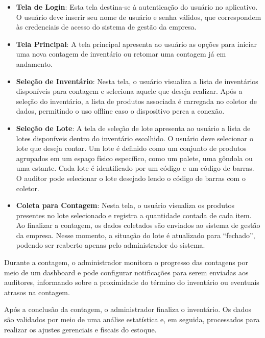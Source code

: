 \begin{itemize}
    \item \textbf{Tela de Login}: Esta tela destina-se à autenticação do usuário no aplicativo. O usuário deve inserir seu nome de usuário e senha válidos, que correspondem às credenciais de acesso do sistema de gestão da empresa.

    \item \textbf{Tela Principal}: A tela principal apresenta ao usuário as opções para iniciar uma nova contagem de inventário ou retomar uma contagem já em andamento.

    \item \textbf{Seleção de Inventário}: Nesta tela, o usuário visualiza a lista de inventários disponíveis para contagem e seleciona aquele que deseja realizar. Após a seleção do inventário, a lista de produtos associada é carregada no coletor de dados, permitindo o uso offline caso o dispositivo perca a conexão.

    \item \textbf{Seleção de Lote}: A tela de seleção de lote apresenta ao usuário a lista de lotes disponíveis dentro do inventário escolhido. O usuário deve selecionar o lote que deseja contar. Um lote é definido como um conjunto de produtos agrupados em um espaço físico específico, como um palete, uma gôndola ou uma estante. Cada lote é identificado por um código e um código de barras. O auditor pode selecionar o lote desejado lendo o código de barras com o coletor.

    \item \textbf{Coleta para Contagem}: Nesta tela, o usuário visualiza os produtos presentes no lote selecionado e registra a quantidade contada de cada item. Ao finalizar a contagem, os dados coletados são enviados ao sistema de gestão da empresa. Nesse momento, a situação do lote é atualizado para “fechado”, podendo ser reaberto apenas pelo administrador do sistema.
\end{itemize}

Durante a contagem, o administrador monitora o progresso das contagens por meio de um dashboard e pode configurar notificações para serem enviadas aos auditores, informando sobre a proximidade do término do inventário ou eventuais atrasos na contagem.

Após a conclusão da contagem, o administrador finaliza o inventário. Os dados são validados por meio de uma análise estatística e, em seguida, processados para realizar os ajustes gerenciais e fiscais do estoque.

